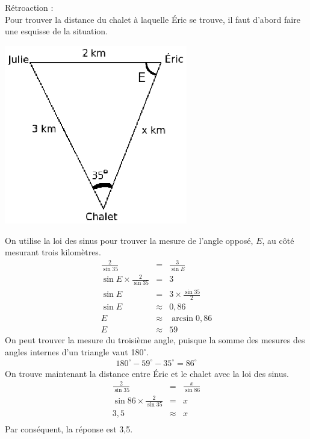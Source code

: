 \documentclass[letterpaper, 12pt]{article}
\begin{document}
R\'etroaction :\\
Pour trouver la distance du chalet \`a laquelle \'Eric se trouve, il faut d'abord faire une esquisse de la situation.
\begin{center}
 \includegraphics[width=8cm,bb=14 14 232 185]{Q2404.eps}
\end{center}
On utilise la loi des sinus pour trouver la mesure de l'angle oppos\'e, $E$, au c\^ot\'e mesurant trois kilom\`etres.
\begin{eqnarray*}
 \frac{2}{\sin{35}}&=&\frac{3}{\sin{E}}\\[2mm]
 \sin{E}\times \frac{2}{\sin{35}}&=&3\\[2mm]
 \sin{E}&=&3\times \frac{\sin{35}}{2}\\[2mm]
 \sin{E}&\approx&0,86\\
 E&\approx&\arcsin{0,86}\\
 E&\approx&59
\end{eqnarray*}
On peut trouver la mesure du troisi\`eme angle, puisque la somme des mesures des angles internes d'un triangle vaut 180$^{\circ}$.
\begin{eqnarray*}
 180^{\circ}-59^{\circ}-35^{\circ}=86^{\circ}
\end{eqnarray*}
On trouve maintenant la distance entre \'Eric et le chalet avec la loi des sinus.
\begin{eqnarray*}
  \frac{2}{\sin{35}}&=&\frac{x}{\sin{86}}\\[2mm]
  \sin{86} \times \frac{2}{\sin{35}}&=&x\\[2mm]
  3,5 &\approx&x\\[2mm]
\end{eqnarray*}
Par cons\'equent, la r\'eponse est 3,5.\\
\end{document}
